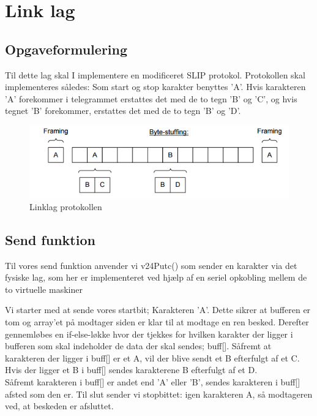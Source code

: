 \chapter{Link lag}

\section{Opgaveformulering}

Til dette lag skal I implementere en modificeret SLIP protokol.
Protokollen skal implementeres således: Som start og stop karakter benyttes ’A’. Hvis karakteren ’A’ forekommer i telegrammet erstattes det med de to tegn ’B’ og ’C’, og hvis tegnet ’B’ forekommer, erstattes det med de to tegn ’B’ og ’D’.
\vspace{10mm}
\begin{figure}[htbp]
\centering
\includegraphics[width=1\linewidth]{Subpages/Billeder/Linklag}
\caption{Linklag protokollen}
\label{fig:Linklag}
\end{figure}

\vspace{10mm}
\section{Send funktion}

Til vores send funktion anvender vi v24Putc() som sender en karakter via det fysiske lag, som her er implementeret ved hjælp af en seriel opkobling mellem de to virtuelle maskiner

Vi starter med at sende vores startbit; Karakteren 'A'. 
Dette sikrer at bufferen er tom og array'et på modtager siden er klar til at modtage en ren besked. 
Derefter gennemløbes en if-else-løkke hvor der tjekkes for hvilken karakter der ligger i bufferen som skal indeholder de data der skal sendes; buff[]. Såfremt at karakteren der ligger i buff[] er et A, vil der blive sendt et B efterfulgt af et C. Hvis der ligger et B i buff[] sendes karakterene B efterfulgt af et D. \\
Såfremt karakteren i buff[] er andet end 'A' eller 'B', sendes karakteren i buff[] afsted som den er. 
Til slut sender vi stopbittet: igen karakteren A, så modtageren ved, at beskeden er afsluttet.

